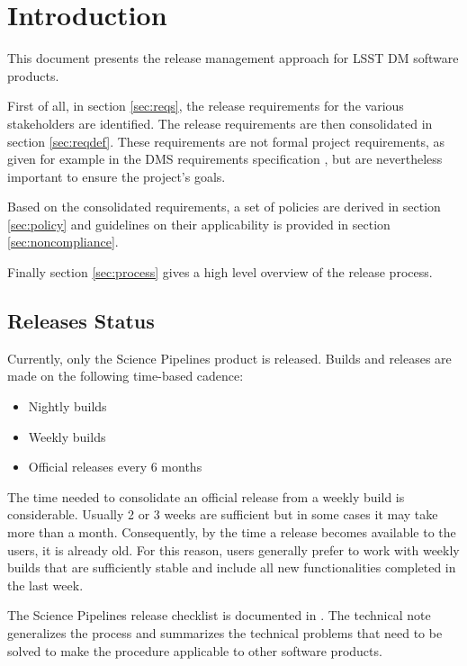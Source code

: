\section{Introduction} \label{sec:intro}

This document presents the release management approach for \gls{LSST} \gls{DM} software products.

First of all, in section \ref{sec:reqs}, the release requirements for the various  stakeholders are identified.
The release requirements are then consolidated in section \ref{sec:reqdef}.
These requirements are not formal project requirements, as given for example in the \gls{DMS} requirements specification , but are nevertheless important to ensure the project's goals.

Based on the consolidated requirements, a set of policies are derived in section \ref{sec:policy} and guidelines on their applicability is provided in section \ref{sec:noncompliance}.

Finally section \ref{sec:process} gives a high level overview of the release process.


\subsection{Releases Status}\label{sec:sci}

Currently, only the \gls{Science Pipelines} product is released.
Builds and releases are made on the following time-based cadence:

\begin{itemize}
\item Nightly builds
\item Weekly builds
\item Official releases every 6 months
\end{itemize}

The time needed to consolidate an official release from a weekly build is considerable.
Usually 2 or 3 weeks are sufficient but in some cases it may take more than a month.
Consequently, by the time a release becomes available to the users, it is already old.
For this reason, users generally prefer to work with weekly builds that are sufficiently stable and include all new functionalities completed in the last week.

The \gls{Science Pipelines} release checklist is documented in .
The technical note  generalizes the process and summarizes the technical problems that need to be solved to make the  procedure applicable to other software products.


